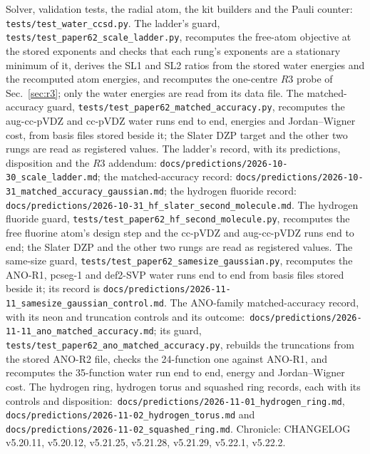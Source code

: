 \documentclass[aps,pra,twocolumn,superscriptaddress,longbibliography]{revtex4-2}
\begin{document}
Solver, validation tests, the radial atom, the kit builders and the
Pauli counter: \texttt{tests/test\_water\_ccsd.py}.  The ladder's guard,
\texttt{tests/test\_paper62\_scale\_ladder.py}, recomputes the
free-atom objective at the stored exponents and checks that each rung's
exponents are a stationary minimum of it, derives the SL1 and SL2
ratios from the stored water energies and the recomputed atom energies,
and recomputes the one-centre $R3$ probe of Sec.~\ref{sec:r3}; only
the water energies are read from its data file.  The matched-accuracy
guard, \texttt{tests/test\_paper62\_matched\_accuracy.py}, recomputes
the aug-cc-pVDZ and cc-pVDZ water runs end to end, energies and
Jordan--Wigner cost, from basis files stored beside it; the Slater DZP
target and the other two rungs are read as registered values.  The ladder's record,
with its predictions, disposition and the $R3$ addendum:
\texttt{docs/predictions/2026-10-30\_scale\_ladder.md}; the
matched-accuracy record:
\texttt{docs/predictions/2026-10-31\_matched\_accuracy\_gaussian.md};
the hydrogen fluoride record:
\texttt{docs/predictions/2026-10-31\_hf\_slater\_second\_molecule.md}.
The hydrogen fluoride guard,
\texttt{tests/test\_paper62\_hf\_second\_molecule.py}, recomputes the
free fluorine atom's design step and the cc-pVDZ and aug-cc-pVDZ runs end
to end; the Slater DZP and the other two rungs are read as registered
values.
The same-size guard, \texttt{tests/test\_paper62\_samesize\_gaussian.py},
recomputes the ANO-R1, pcseg-1 and def2-SVP water runs end to end from
basis files stored beside it; its record is
\texttt{docs/predictions/2026-11-11\_samesize\_gaussian\_control.md}.
The ANO-family matched-accuracy record, with its neon and truncation
controls and its outcome:\
\texttt{docs/predictions/2026-11-11\_ano\_matched\_accuracy.md}; its
guard, \texttt{tests/test\_paper62\_ano\_matched\_accuracy.py}, rebuilds
the truncations from the stored ANO-R2 file, checks the 24-function one
against ANO-R1, and recomputes the 35-function water run end to end,
energy and Jordan--Wigner cost.
The hydrogen ring, hydrogen torus and squashed ring records, each with its
controls and disposition:\ \texttt{docs/predictions/2026-11-01\_hydrogen\_ring.md},
\texttt{docs/predictions/2026-11-02\_hydrogen\_torus.md} and
\texttt{docs/predictions/2026-11-02\_squashed\_ring.md}.
Chronicle: CHANGELOG v5.20.11, v5.20.12, v5.21.25, v5.21.28, v5.21.29,
v5.22.1, v5.22.2.
\end{document}

